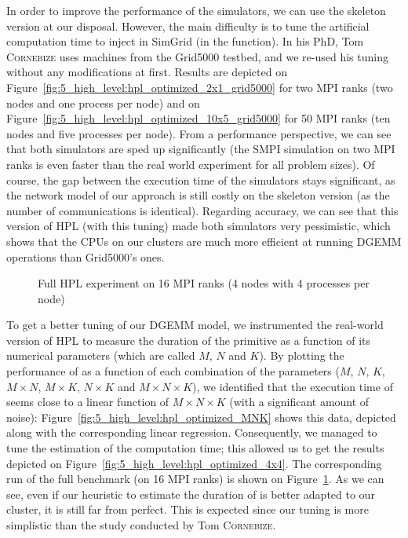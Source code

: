 In order to improve the performance of the simulators, we can use the skeleton
version at our disposal. However, the main difficulty is to tune the artificial
computation time to inject in SimGrid (in the  function). In
his PhD, Tom \textsc{Cornebize} uses machines from the Grid5000 testbed, and we
re-used his tuning without any modifications at first. Results are depicted on
Figure~\ref{fig:5_high_level:hpl_optimized_2x1_grid5000} for two MPI ranks (two
nodes and one process per node) and on
Figure~\ref{fig:5_high_level:hpl_optimized_10x5_grid5000} for 50 MPI ranks (ten
nodes and five processes per node). From a performance perspective, we can see
that both simulators are sped up significantly (the SMPI simulation on two MPI
ranks is even faster than the real world experiment for all problem sizes). Of
course, the gap between the execution time of the simulators stays significant,
as the network model of our approach is still costly on the skeleton version (as
the number of communications is identical). Regarding accuracy, we can see that
this version of HPL (with this tuning) made both simulators very pessimistic,
which shows that the CPUs on our clusters are much more efficient at running
DGEMM operations than Grid5000's ones.


\begin{figure}[!ht]
    \centering
    \caption{Full HPL experiment on 16 MPI ranks (4 nodes with 4 processes per node)}
    \label{fig:5_high_level:hpl_vanilla_4x4}
\end{figure}

To get a better tuning of our DGEMM model, we instrumented the real-world
version of HPL to measure the duration of the  primitive as a
function of its numerical parameters (which are called $M$, $N$ and $K$). By
plotting the performance of  as a function of each combination
of the parameters ($M$, $N$, $K$, $M \times N$, $M \times K$, $N \times K$ and
$M \times N \times K$), we identified that the execution time of
 seems close to a linear function of $M \times N \times K$
(with a significant amount of noise):
Figure~\ref{fig:5_high_level:hpl_optimized_MNK} shows this data, depicted along
with the corresponding linear regression. Consequently, we managed to tune the
estimation of the computation time; this allowed us to get the results depicted
on Figure~\ref{fig:5_high_level:hpl_optimized_4x4}. The corresponding run of the
full benchmark (on 16 MPI ranks) is shown on
Figure~\ref{fig:5_high_level:hpl_vanilla_4x4}. As we can see, even if our
heuristic to estimate the duration of  is better adapted to
our cluster, it is still far from perfect. This is expected since our tuning is
more simplistic than the study conducted by Tom \textsc{Cornebize}.

